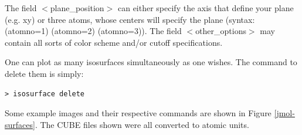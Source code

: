 The field $<$plane\_position$>$ can either specify the axis that
define your plane (e.g. xy) or three atoms, whose centers will specify
the plane (syntax: (atomno=1) (atomno=2) (atomno=3)). The field
$<$other\_options$>$ may contain all sorts of color scheme and/or
cutoff specifications.  

One can plot as many isosurfaces simultaneously as one wishes. The
command to delete them is simply:  

\begin{verbatim}
> isosurface delete
\end{verbatim}

Some example images and their respective commands are shown in Figure
\ref{jmol-surfaces}. The CUBE files shown were all converted to atomic
units. 

\begin{figure}[htbp]
\begin{center}
\end{center}
\end{figure}

